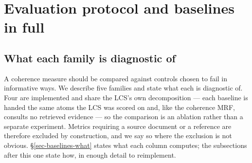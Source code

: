 \section{Evaluation protocol and baselines in full}
\label{app-protocol}

\subsection{What each family is diagnostic of}
\label{app-baseline-families}

A coherence measure should be compared against controls chosen to fail in informative ways. We
describe five families and state what each is diagnostic of. Four are implemented and share the
LCS's own decomposition --- each baseline is handed the same atoms the LCS was scored on and, like
the coherence MRF, consults no retrieved evidence --- so the comparison is an ablation rather than a
separate experiment. Metrics requiring a source document or a reference are therefore excluded by
construction, and we say so where the exclusion is not obvious. \S\ref{sec-baselines-what} states
what each column computes; the subsections after this one state how, in enough detail to
reimplement.

